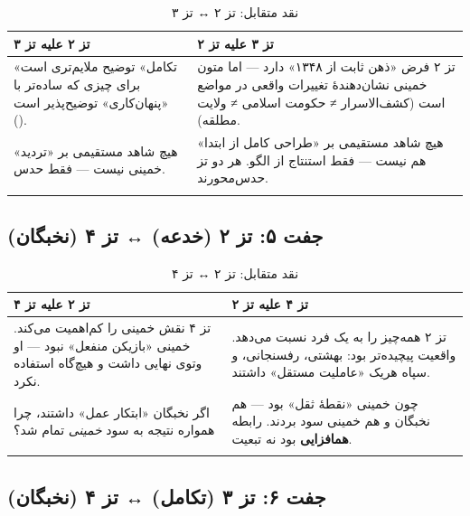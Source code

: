 \documentclass[12pt,a4paper]{book}
\newcommand{\keyword}[1]{\textbf{\textcolor{cPrimary}{#1}}}
\newcommand{\en}[1]{\lr{\textit{#1}}}
\begin{document}
\begin{longtable}{%
    >{\raggedleft\arraybackslash}p{}
    >{\raggedleft\arraybackslash}p{}}
\toprule
\rowcolor{cAccent!8}
\textbf{تز ۲ علیه تز ۳} &
\rowcolor{cGold!10}
\textbf{تز ۳ علیه تز ۲} \\
\midrule

«تکامل» توضیح ملایم‌تری است برای چیزی که ساده‌تر با «پنهان‌کاری» توضیح‌پذیر است (\en{Occam's Razor}). &
تز ۲ فرض «ذهن ثابت از ۱۳۴۸» دارد — اما متون خمینی نشان‌دهندهٔ تغییرات واقعی در مواضع است (کشف‌الاسرار ≠ حکومت اسلامی ≠ ولایت مطلقه). \\
\midrule

هیچ شاهد مستقیمی بر «تردید» خمینی نیست — فقط حدس. &
هیچ شاهد مستقیمی بر «طراحی کامل از ابتدا» هم نیست — فقط استنتاج از الگو. هر دو تز حدس‌محورند. \\

\bottomrule
\caption{نقد متقابل: تز ۲ ↔ تز ۳}
\end{longtable}

\subsection{جفت ۵: تز ۲ (خدعه) ↔ تز ۴ (نخبگان)}

\begin{longtable}{%
    >{\raggedleft\arraybackslash}p{}
    >{\raggedleft\arraybackslash}p{}}
\toprule
\rowcolor{cAccent!8}
\textbf{تز ۲ علیه تز ۴} &
\rowcolor{cConsolid!8}
\textbf{تز ۴ علیه تز ۲} \\
\midrule

تز ۴ نقش خمینی را کم‌اهمیت می‌کند. خمینی «بازیکن منفعل» نبود — او وتوی نهایی داشت و هیچ‌گاه استفاده نکرد. &
تز ۲ همه‌چیز را به یک فرد نسبت می‌دهد. واقعیت پیچیده‌تر بود: بهشتی، رفسنجانی، و سپاه هر‌یک «عاملیت مستقل» داشتند. \\
\midrule

اگر نخبگان «ابتکار عمل» داشتند، چرا همواره نتیجه به سود \textit{خمینی} تمام شد؟ &
چون خمینی «نقطهٔ ثقل» بود — هم نخبگان و هم خمینی سود بردند. رابطه \keyword{همافزایی} بود نه تبعیت. \\

\bottomrule
\caption{نقد متقابل: تز ۲ ↔ تز ۴}
\end{longtable}

\subsection{جفت ۶: تز ۳ (تکامل) ↔ تز ۴ (نخبگان)}
\end{document}
